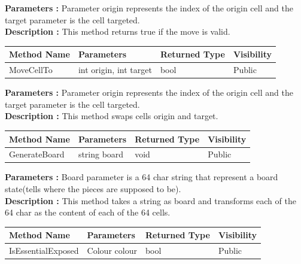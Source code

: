 \documentclass[12pt]{article}
\begin{document}
\textbf{Parameters :} Parameter origin represents the index of
the origin cell and the target parameter is the cell targeted.
\\

\textbf{Description :} This method returns true if the move is valid.

\begin{table}[H]
    \begin{tabular}{|l|l|l|l|}
    \hline
    \rowcolor[HTML]{EFEFEF} 
    \cellcolor[HTML]{EFEFEF}\textbf{Method Name} & \textbf{Parameters}     & \textbf{Returned Type} & \textbf{Visibility} \\ \hline
    MoveCellTo                                   & int origin, int target  & bool                   & Public              \\ \hline
    \end{tabular}
\end{table}

\textbf{Parameters :} Parameter origin represents the index of
the origin cell and the target parameter is the cell targeted.
\\

\textbf{Description :} This method swaps cells origin and target.

\begin{table}[H]
    \begin{tabular}{|l|l|l|l|}
    \hline
    \rowcolor[HTML]{EFEFEF} 
    \cellcolor[HTML]{EFEFEF}\textbf{Method Name} & \textbf{Parameters}     & \textbf{Returned Type} & \textbf{Visibility} \\ \hline
    GenerateBoard                              & string board            & void                   & Public              \\ \hline
    \end{tabular}
\end{table}

\textbf{Parameters :} Board parameter is a 64 char string that represent
a board state(tells where the pieces are supposed to be).
\\

\textbf{Description :} This method takes a string as board and transforms
each of the 64 char as the content of each of the 64 cells.

\begin{table}[H]
    \begin{tabular}{|l|l|l|l|}
    \hline
    \rowcolor[HTML]{EFEFEF} 
    \cellcolor[HTML]{EFEFEF}\textbf{Method Name} & \textbf{Parameters}     & \textbf{Returned Type} & \textbf{Visibility} \\ \hline
    IsEssentialExposed                           & Colour colour           & bool                   & Public              \\ \hline
    \end{tabular}
\end{table}
\end{document}
